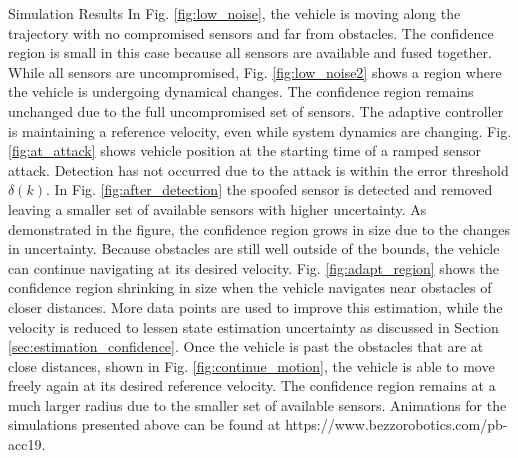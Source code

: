 \begin{section}{Simulation Results}
In Fig. \ref{fig:low_noise}, the vehicle is moving along the trajectory with no compromised sensors and far from obstacles. The confidence region is small in this case because all sensors are available and fused together. While all sensors are uncompromised, Fig. \ref{fig:low_noise2} shows a region where the vehicle is undergoing dynamical changes. The confidence region remains unchanged due to the full uncompromised set of sensors. The adaptive controller is maintaining a reference velocity, even while system dynamics are changing. Fig. \ref{fig:at_attack} shows vehicle position at the starting time of a ramped sensor attack. Detection has not occurred due to the attack is within the error threshold $\delta(k)$. In Fig. \ref{fig:after_detection} the spoofed sensor is detected and removed leaving a smaller set of available sensors with higher uncertainty. As demonstrated in the figure, the confidence region grows in size due to the changes in uncertainty. Because obstacles are still well outside of the bounds, the vehicle can continue navigating at its desired velocity. Fig. \ref{fig:adapt_region} shows the confidence region shrinking in size when the vehicle navigates near obstacles of closer distances. More data points are used to improve this estimation, while the velocity is reduced to lessen state estimation uncertainty as discussed in Section \ref{sec:estimation_confidence}. Once the vehicle is past the obstacles that are at close distances, shown in Fig. \ref{fig:continue_motion}, the vehicle is able to move freely again at its desired reference velocity. The confidence region remains at a much larger radius due to the smaller set of available sensors. Animations for the simulations presented above can be found at https://www.bezzorobotics.com/pb-acc19.



\end{section}
